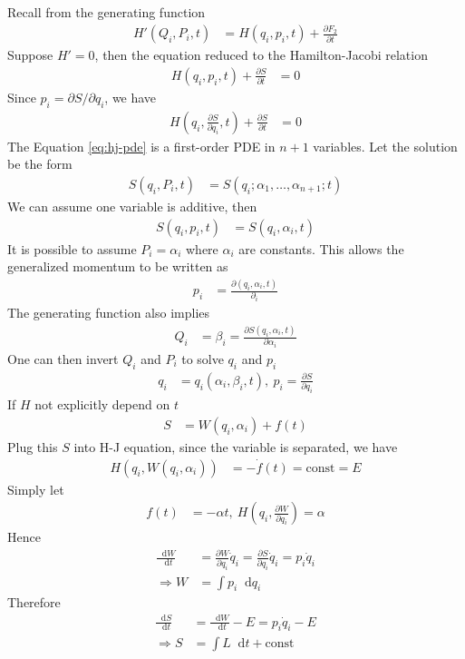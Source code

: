 \documentclass[twoside,9pt]{article}
\numberwithin{equation}{section} %
\renewcommand*\d{\mathop{}\!\mathrm{d}}
\theoremstyle{definition}
\theoremstyle{remark}
\begin{document}
Recall from the generating function
\begin{align}
    H'(Q_i, P_i, t) &= H(q_i, p_i, t) + \frac{\partial F_2}{\partial t}
\end{align}
Suppose $H'=0$, then the equation reduced to the Hamilton-Jacobi relation
\begin{align}
    H(q_i, p_i, t) + \frac{\partial S}{\partial t} &= 0 
\end{align}
Since $p_i = \partial S/\partial q_i$, we have
\begin{align}
    H\left( q_i, \frac{\partial S}{\partial q_i}, t \right) 
    + \frac{\partial S}{\partial t} &= 0\label{eq:hj-pde}
\end{align}
The Equation \ref{eq:hj-pde} is a first-order PDE in $n+1$ variables.
Let the solution be the form 
\begin{align}
    S(q_i, P_i, t) &= 
    S(q_i; \alpha_1,\dots,\alpha_{n+1}; t)
\end{align}
We can assume one variable is additive, then
\begin{align}
    S(q_i, p_i, t) &= 
    S(q_i, \alpha_i, t)
\end{align}
It is possible to assume $P_i = \alpha_i$ where $\alpha_i$ are constants.
This allows the generalized momentum to be written as
\begin{align}
    p_i &= \frac{\partial(q_i, \alpha_i, t)}{\partial_i}
\end{align}
The generating function also implies 
\begin{align}
    Q_i &= \beta_i = \frac{\partial S(q_i, \alpha_i, t)}{\partial \alpha_i}
\end{align}
One can then invert $Q_i$ and $P_i$ to solve $q_i$ and $p_i$
\begin{align}
    q_i &= q_i(\alpha_i, \beta_i, t),~
    p_i  = \frac{\partial S}{\partial q_i}
\end{align}
If $H$ not explicitly depend on $t$
\begin{align}
    S &= W(q_i, \alpha_i) + f(t)
\end{align}
Plug this $S$ into H-J equation, since the variable is separated, we have
\begin{align}
    H\left( q_i, W(q_i, \alpha_i) \right) &= -\dot f(t) = \text{const} = E
\end{align}
Simply let
\begin{align}
    f(t) &= -\alpha t, ~
    H\left( q_i, \frac{\partial W}{\partial q_i} \right) = \alpha
\end{align}
Hence
\begin{align}
    \frac{\d W}{\d t} &= 
    \frac{\partial W}{\partial q_i}\dot q_i =
    \frac{\partial S}{\partial q_i}\dot q_i =
    p_i \dot q_i\\
    \Rightarrow
    W &= \int p_i\d q_i
\end{align}
Therefore
\begin{align}
    \frac{\d S}{\d t} &= \frac{\d W}{\d t} - E = p_i\dot q_i - E\\
    \Rightarrow S &= \int L\d t + \text{const}
\end{align}
\end{document}
